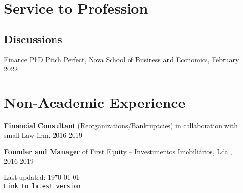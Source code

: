 \documentclass[letterpaper]{article}
\def\footerlink{https://miguelcfoliveira.github.io/CV/CV.pdf}
\renewenvironment{itemize}{
  \begin{list}{}{
    \setlength{\leftmargin}{1.5em}
  }
}{
  \end{list}
}
\begin{document}
\section*{Service to Profession}
\subsection*{Discussions}

\begin{itemize}
\item Finance PhD Pitch Perfect, Nova School of Business and Economics, February 2022
\end{itemize}

\section*{Non-Academic Experience}

\begin{itemize}
\item \textbf{Financial Consultant} (Reorganizations/Bankruptcies) in collaboration with small Law firm, 2016-2019
\item \textbf{Founder and Manager} of First Equity – Investimentos Imobiliários, Lda., 2016-2019
\end{itemize}




\bigskip

\begin{center}
  \begin{footnotesize}
    Last updated: \today \\
    \href{\footerlink}{\texttt{Link to latest version}}
  \end{footnotesize}
\end{center}
\end{document}
